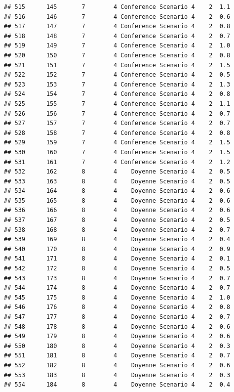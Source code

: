 \documentclass[
]{article}
\begin{document}
\begin{verbatim}
## 515      145       7        4 Conference Scenario 4    2  1.1
## 516      146       7        4 Conference Scenario 4    2  0.6
## 517      147       7        4 Conference Scenario 4    2  0.8
## 518      148       7        4 Conference Scenario 4    2  0.7
## 519      149       7        4 Conference Scenario 4    2  1.0
## 520      150       7        4 Conference Scenario 4    2  0.8
## 521      151       7        4 Conference Scenario 4    2  1.5
## 522      152       7        4 Conference Scenario 4    2  0.5
## 523      153       7        4 Conference Scenario 4    2  1.3
## 524      154       7        4 Conference Scenario 4    2  0.8
## 525      155       7        4 Conference Scenario 4    2  1.1
## 526      156       7        4 Conference Scenario 4    2  0.7
## 527      157       7        4 Conference Scenario 4    2  0.7
## 528      158       7        4 Conference Scenario 4    2  0.8
## 529      159       7        4 Conference Scenario 4    2  1.5
## 530      160       7        4 Conference Scenario 4    2  1.5
## 531      161       7        4 Conference Scenario 4    2  1.2
## 532      162       8        4    Doyenne Scenario 4    2  0.5
## 533      163       8        4    Doyenne Scenario 4    2  0.5
## 534      164       8        4    Doyenne Scenario 4    2  0.6
## 535      165       8        4    Doyenne Scenario 4    2  0.6
## 536      166       8        4    Doyenne Scenario 4    2  0.6
## 537      167       8        4    Doyenne Scenario 4    2  0.5
## 538      168       8        4    Doyenne Scenario 4    2  0.7
## 539      169       8        4    Doyenne Scenario 4    2  0.4
## 540      170       8        4    Doyenne Scenario 4    2  0.9
## 541      171       8        4    Doyenne Scenario 4    2  0.1
## 542      172       8        4    Doyenne Scenario 4    2  0.5
## 543      173       8        4    Doyenne Scenario 4    2  0.7
## 544      174       8        4    Doyenne Scenario 4    2  0.7
## 545      175       8        4    Doyenne Scenario 4    2  1.0
## 546      176       8        4    Doyenne Scenario 4    2  0.8
## 547      177       8        4    Doyenne Scenario 4    2  0.7
## 548      178       8        4    Doyenne Scenario 4    2  0.6
## 549      179       8        4    Doyenne Scenario 4    2  0.6
## 550      180       8        4    Doyenne Scenario 4    2  0.3
## 551      181       8        4    Doyenne Scenario 4    2  0.7
## 552      182       8        4    Doyenne Scenario 4    2  0.6
## 553      183       8        4    Doyenne Scenario 4    2  0.3
## 554      184       8        4    Doyenne Scenario 4    2  0.4

\end{verbatim}
\end{document}
